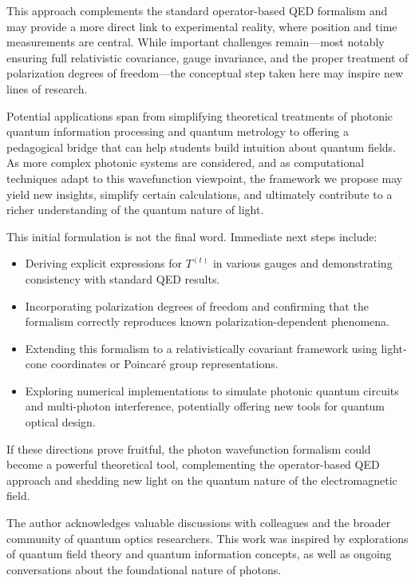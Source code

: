 \documentclass[aps,prl,twocolumn,showpacs,showkeys,superscriptaddress,amsmath,amssymb]{revtex4-2}
\begin{document}
This approach complements the standard operator-based QED formalism and may provide a more direct link to experimental reality, where position and time measurements are central. While important challenges remain—most notably ensuring full relativistic covariance, gauge invariance, and the proper treatment of polarization degrees of freedom—the conceptual step taken here may inspire new lines of research.

Potential applications span from simplifying theoretical treatments of photonic quantum information processing and quantum metrology to offering a pedagogical bridge that can help students build intuition about quantum fields. As more complex photonic systems are considered, and as computational techniques adapt to this wavefunction viewpoint, the framework we propose may yield new insights, simplify certain calculations, and ultimately contribute to a richer understanding of the quantum nature of light.

This initial formulation is not the final word. Immediate next steps include:
\begin{itemize}
    \item Deriving explicit expressions for $T^{(t)}$ in various gauges and demonstrating consistency with standard QED results.
    \item Incorporating polarization degrees of freedom and confirming that the formalism correctly reproduces known polarization-dependent phenomena.
    \item Extending this formalism to a relativistically covariant framework using light-cone coordinates or Poincaré group representations.
    \item Exploring numerical implementations to simulate photonic quantum circuits and multi-photon interference, potentially offering new tools for quantum optical design.
\end{itemize}

If these directions prove fruitful, the photon wavefunction formalism could become a powerful theoretical tool, complementing the operator-based QED approach and shedding new light on the quantum nature of the electromagnetic field.

\begin{acknowledgments}
The author acknowledges valuable discussions with colleagues and the broader community of quantum optics researchers. This work was inspired by explorations of quantum field theory and quantum information concepts, as well as ongoing conversations about the foundational nature of photons.
\end{acknowledgments}
\end{document}
